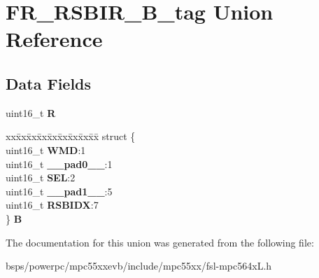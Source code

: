 \hypertarget{unionFR__RSBIR__16B__tag}{}\section{F\+R\+\_\+\+R\+S\+B\+I\+R\+\_\+B\+\_\+tag Union Reference}
\label{unionFR__RSBIR__16B__tag}
\subsection*{Data Fields}
\begin{DoxyCompactItemize}
\item 
\mbox{\label{unionFR__RSBIR__16B__tag_abe0b33be40032445971941d3b7b1f2d1}} 
uint16\+\_\+t {\bfseries R}
\item 
\mbox{\label{unionFR__RSBIR__16B__tag_a94a91452e53fcc83acd90a5a1e264bfa}} 
\begin{tabbing}
xx\=xx\=xx\=xx\=xx\=xx\=xx\=xx\=xx\=\kill
struct \{\\
\>uint16\_t {\bfseries WMD}:1\\
\>uint16\_t {\bfseries \_\_pad0\_\_}:1\\
\>uint16\_t {\bfseries SEL}:2\\
\>uint16\_t {\bfseries \_\_pad1\_\_}:5\\
\>uint16\_t {\bfseries RSBIDX}:7\\
\} {\bfseries B}\\

\end{tabbing}\end{DoxyCompactItemize}


The documentation for this union was generated from the following file\+:\begin{DoxyCompactItemize}
\item 
bsps/powerpc/mpc55xxevb/include/mpc55xx/fsl-\/mpc564x\+L.\+h\end{DoxyCompactItemize}
